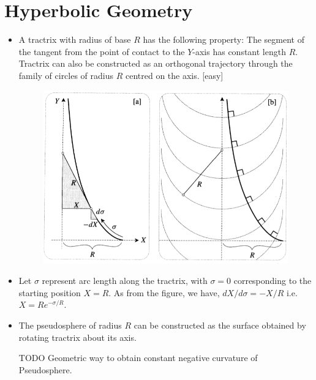 \documentclass[12pt]{article}
\begin{document}
\section{Hyperbolic Geometry}
\begin{itemize}
    \item A tractrix with radius of base $R$ has the following property: The segment of the tangent from the point of contact to the $Y$-axis has constant length $R$. Tractrix can also be constructed as an orthogonal trajectory through the family of circles of radius $R$ centred on the axis. [easy]

    \begin{figure}[h!]
        \centering
        \includegraphics[scale=0.7]{fig_12}
        \label{fig_12}
    \end{figure}

    \item Let $\sigma$ represent arc length along the tractrix, with $\sigma=0$ corresponding to the starting position $X=R$. As from the figure, we have, $dX/d\sigma = -X/R$ i.e. $X=Re^{-\sigma/R}$.

    \item The pseudosphere of radius $R$ can be constructed as the surface obtained by rotating tractrix about its axis.

    \item [TODO] Geometric way to obtain constant negative curvature of Pseudosphere.


\end{itemize}
\end{document}

